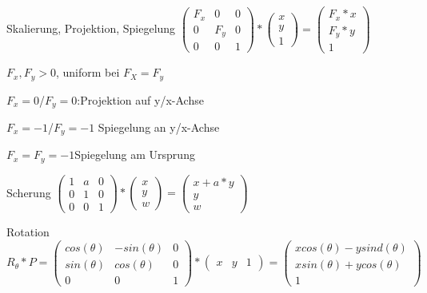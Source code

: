 \documentclass[landscape]{article}
\begin{document}
\begin{multicols}{3}
  \begin{description*}
    \item[Skalierung, Projektion, Spiegelung] $\begin{pmatrix} F_x & 0 & 0 \\ 0 & F_y & 0 \\ 0 & 0 & 1 \end{pmatrix} * \begin{pmatrix} x \\ y \\ 1 \end{pmatrix} = \begin{pmatrix} F_x*x \\ F_y*y \\ 1 \end{pmatrix}$
    
    $F_x,F_y>0$, uniform bei $F_X=F_y$
    
    $F_x=0$/$F_y=0$:Projektion auf y/x-Achse 
    
    $F_x=-1$/$F_y=-1$ Spiegelung an y/x-Achse
    
    $F_x=F_y=-1$Spiegelung am Ursprung
    
    \item[Scherung] $\begin{pmatrix} 1 & a & 0 \\ 0 & 1 & 0 \\ 0 & 0 & 1 \end{pmatrix} * \begin{pmatrix} x \\ y \\ w \end{pmatrix} = \begin{pmatrix} x+a*y \\ y \\ w \end{pmatrix}$
    \item[Rotation] $R_\theta *P= \begin{pmatrix}cos(\theta) & -sin(\theta) & 0 \\ sin(\theta) & cos(\theta) & 0 \\ 0 & 0 & 1 \end{pmatrix} * \begin{pmatrix}x & y & 1 \end{pmatrix} = \begin{pmatrix} x cos(\theta) - y sind(\theta)\\ x sin(\theta)+y cos(\theta)\\ 1 \end{pmatrix}$
  \end{description*}
  

\end{multicols}
\end{document}
